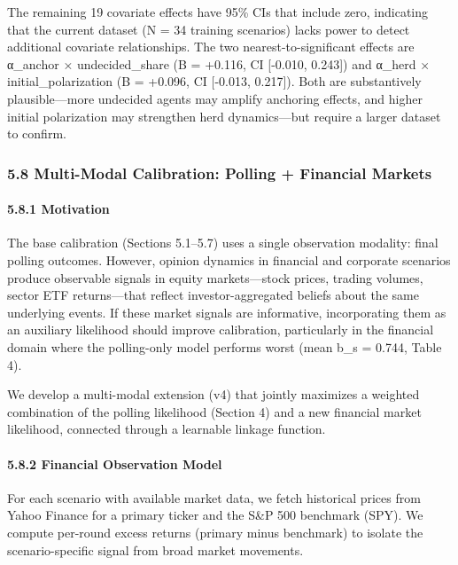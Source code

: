 \documentclass[
]{article}
\begin{document}
The remaining 19 covariate effects have 95\% CIs that include zero,
indicating that the current dataset (N = 34 training scenarios) lacks
power to detect additional covariate relationships. The two
nearest-to-significant effects are α\_anchor × undecided\_share (B =
+0.116, CI {[}-0.010, 0.243{]}) and α\_herd × initial\_polarization (B =
+0.096, CI {[}-0.013, 0.217{]}). Both are substantively plausible---more
undecided agents may amplify anchoring effects, and higher initial
polarization may strengthen herd dynamics---but require a larger dataset
to confirm.

\subsubsection{5.8 Multi-Modal Calibration: Polling + Financial
Markets}\label{multi-modal-calibration-polling-financial-markets}

\paragraph{5.8.1 Motivation}\label{motivation-1}

The base calibration (Sections 5.1--5.7) uses a single observation
modality: final polling outcomes. However, opinion dynamics in financial
and corporate scenarios produce observable signals in equity
markets---stock prices, trading volumes, sector ETF returns---that
reflect investor-aggregated beliefs about the same underlying events. If
these market signals are informative, incorporating them as an auxiliary
likelihood should improve calibration, particularly in the financial
domain where the polling-only model performs worst (mean
\textbar b\_s\textbar{} = 0.744, Table 4).

We develop a multi-modal extension (v4) that jointly maximizes a
weighted combination of the polling likelihood (Section 4) and a new
financial market likelihood, connected through a learnable linkage
function.

\paragraph{5.8.2 Financial Observation
Model}\label{financial-observation-model}

For each scenario with available market data, we fetch historical prices
from Yahoo Finance for a primary ticker and the S\&P 500 benchmark
(SPY). We compute per-round excess returns (primary minus benchmark) to
isolate the scenario-specific signal from broad market movements.
\end{document}
